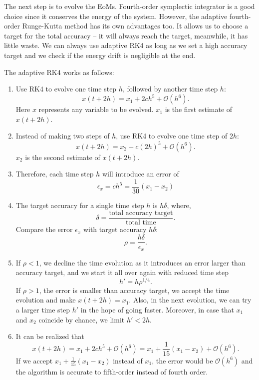 \documentclass[12pt,a4paper]{article}
\begin{document}
The next step is to evolve the EoMs. Fourth-order symplectic integrator is a good choice since it conserves the energy of the system. However, the adaptive fourth-order Runge-Kutta method has its own advantages too. It allows us to choose a target for the total accuracy -- it will always reach the target, meanwhile, it has little waste. We can always use adaptive RK4 as long as we set a high accuracy target and we check if the energy drift is negligible at the end.

The adaptive RK4 works as follows:
\begin{enumerate}
	\item Use RK4 to evolve one time step $h$, followed by another time step $h$:
	\[ x(t+2h) = x_1 + 2ch^5 + \mathcal{O}(h^6). \]
	Here $x$ represents any variable to be evolved. $x_1$ is the first estimate of $x(t+2h)$.
	
	\item Instead of making two steps of $h$, use RK4 to evolve one time step of $2h$:
	\[ x(t+2h) = x_2 + c{(2h)}^5 + \mathcal{O}(h^6). \]
	$x_2$ is the second estimate of $x(t+2h)$.
	
	\item Therefore, each time step $h$ will introduce an error of 
	\[ \epsilon_x = ch^5 = \frac{1}{30}(x_1-x_2) \]
	
	\item The target accuracy for a single time step $h$ is $h \delta$, where,
	\[ \delta = \frac{\textrm{total accuracy target}}{\textrm{total time}}. \]
	Compare the error $\epsilon_x$ with target accuracy $h \delta$:
	\[ \rho = \frac{h \delta}{\epsilon_x}.  \]
	
	\item If $\rho<1$, we decline the time evolution as it introduces an error larger than accuracy target, and we start it all over again with reduced time step 
	\[ h' = h {\rho}^{1/4}. \]
	If $\rho>1$, the error is smaller than accuracy target, we accept the time evolution and make $x(t+2h) = x_1$. Also, in the next evolution, we can try a larger time step $h'$ in the hope of going faster. Moreover, in case that $x_1$ and $x_2$ coincide by chance, we limit $h'<2h$.
	
	\item It can be realized that
	\[ x(t+2h) = x_1 + 2ch^5 + \mathcal{O}(h^6) = x_1 + \frac{1}{15}(x_1-x_2) + \mathcal{O}(h^6). \]
	If we accept $x_1 + \frac{1}{15}(x_1-x_2)$ instead of $x_1$, the error would be $\mathcal{O}(h^6)$ and the algorithm is accurate to fifth-order instead of fourth order.
	
\end{enumerate}
\end{document}
